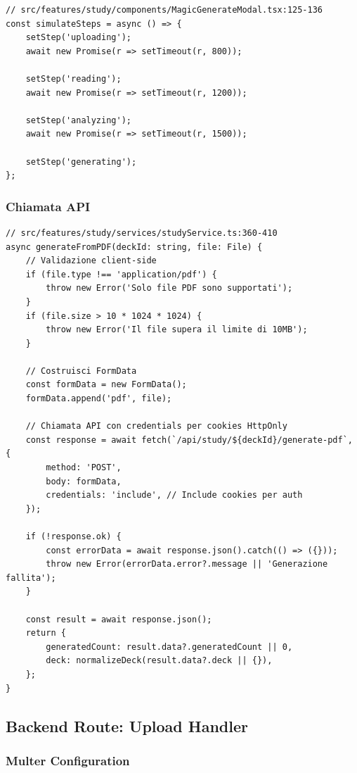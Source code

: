 \documentclass[11pt,a4paper]{article}
\begin{document}
\begin{lstlisting}[caption=Simulazione Progress Steps]
// src/features/study/components/MagicGenerateModal.tsx:125-136
const simulateSteps = async () => {
    setStep('uploading');
    await new Promise(r => setTimeout(r, 800));
    
    setStep('reading');
    await new Promise(r => setTimeout(r, 1200));
    
    setStep('analyzing');
    await new Promise(r => setTimeout(r, 1500));
    
    setStep('generating');
};
\end{lstlisting}

\subsubsection{Chiamata API}

\begin{lstlisting}[caption=Upload PDF - Frontend Service]
// src/features/study/services/studyService.ts:360-410
async generateFromPDF(deckId: string, file: File) {
    // Validazione client-side
    if (file.type !== 'application/pdf') {
        throw new Error('Solo file PDF sono supportati');
    }
    if (file.size > 10 * 1024 * 1024) {
        throw new Error('Il file supera il limite di 10MB');
    }

    // Costruisci FormData
    const formData = new FormData();
    formData.append('pdf', file);

    // Chiamata API con credentials per cookies HttpOnly
    const response = await fetch(`/api/study/${deckId}/generate-pdf`, {
        method: 'POST',
        body: formData,
        credentials: 'include', // Include cookies per auth
    });

    if (!response.ok) {
        const errorData = await response.json().catch(() => ({}));
        throw new Error(errorData.error?.message || 'Generazione fallita');
    }

    const result = await response.json();
    return {
        generatedCount: result.data?.generatedCount || 0,
        deck: normalizeDeck(result.data?.deck || {}),
    };
}
\end{lstlisting}

\subsection{Backend Route: Upload Handler}

\subsubsection{Multer Configuration}
\end{document}
